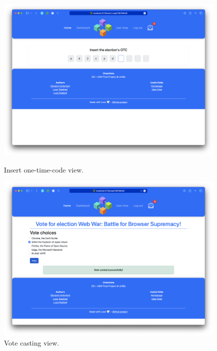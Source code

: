 \documentclass{scrartcl}
\begin{document}
\begin{figure}
    \centering
    \includegraphics[width=0.9\linewidth]{figures/story-board/10-insert-code.png}
    \label{fig:insert-code}
    \caption{Insert one-time-code view.}
\end{figure}

\begin{figure}
    \centering
    \includegraphics[width=0.9\linewidth]{figures/story-board/11-cast-vote.png}
    \caption{Vote casting view.}
    \label{fig:cast-vote}
\end{figure}
\end{document}
